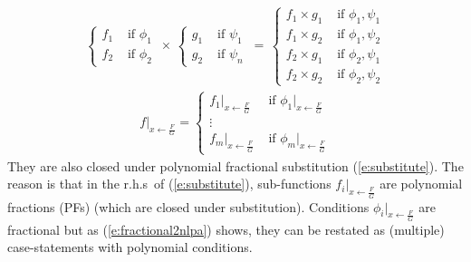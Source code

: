 \documentclass[letterpaper]{article}
\newcommand{\case}[2]{#2 &\text{ if } #1}%
\begin{document}
{\footnotesize
\begin{align}\label{e:mult}
\begin{cases}
  \case{\phi_1}{f_1}\\
  \case{\phi_2}{f_2}    
  \end{cases}
\,
 \times
\,
  \begin{cases}
  \case{\psi_1}{g_1} \\
  \case{\psi_n}{g_2} 
  \end{cases}
 \, = \,
\begin{cases}
  \case{\phi_1, \psi_1}{f_1 \times g_1} \\ 
  \case{\phi_1, \psi_2}{f_1 \times g_2} \\
  \case{\phi_2, \psi_1}{f_2 \times g_1} \\
  \case{\phi_2, \psi_2}{f_2 \times g_2}
  \end{cases}
\end{align} 
\begin{align}\label{e:substitute}
f|_{x \leftarrow \frac{F}{G}}
=
\begin{cases}
  \case{{\phi_1}|_{x \leftarrow \frac{F}{G}}}{{f_1}|_{x \leftarrow \frac{F}{G}}}\\
\vdots\\
  \case{{\phi_m}|_{x \leftarrow \frac{F}{G}}}{{f_m}|_{x \leftarrow \frac{F}{G}}}    
  \end{cases}
\end{align} 
}
%
They are also closed under polynomial fractional substitution (\ref{e:substitute}). 
The reason is that in the r.h.s\ of (\ref{e:substitute}), 
sub-functions $f_i |_{x \leftarrow \frac{F}{G}}$ are polynomial fractions (PFs) 
(which are closed under substitution).
Conditions ${\phi_i}|_{x \leftarrow \frac{F}{G}}$ are fractional but as
(\ref{e:fractional2nlpa}) shows, 
they can be restated as (multiple) case-statements with polynomial conditions. 
\\
\end{document}
